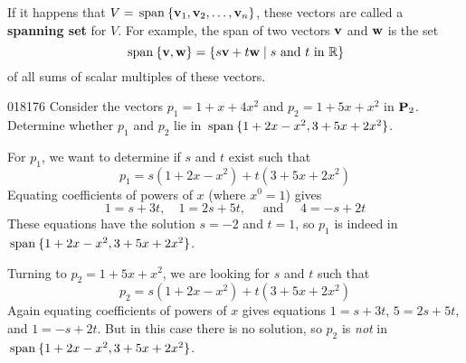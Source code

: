 \noindent If it happens that $V = \thinspace\operatorname{span\medspace}\{\textbf{v}_{1}, \textbf{v}_{2}, \dots, \textbf{v}_{n}\}$, these vectors are called a \textbf{spanning set} for $V$. For example, the span of two vectors $\textbf{v}$ and $\textbf{w}$ is the set
\begin{equation*}
\thinspace\operatorname{span\medspace}\{\textbf{v}, \textbf{w} \} = \{s\textbf{v} + t\textbf{w} \mid s \mbox{ and } t \mbox{ in } \mathbb{R} \}
\end{equation*}
of all sums of scalar multiples of these vectors.

\begin{example}{}{018176}
Consider the vectors $p_{1} = 1 + x + 4x^{2}$ and $p_{2} = 1 + 5x + x^{2}$ in $\textbf{P}_{2}$. Determine whether $p_{1}$ and $p_{2}$ lie in $\thinspace\operatorname{span\medspace}\{1 + 2x - x^{2}, 3 + 5x + 2x^{2}\}$.

\begin{solution}
For $p_{1}$, we want to determine if $s$ and $t$ exist such that
\begin{equation*}
p_1 = s(1 + 2x - x^2) + t(3 + 5x + 2x^2)
\end{equation*}
Equating coefficients of powers of $x$ (where $x^{0} = 1$) gives
\begin{equation*}
1 = s + 3t,\quad 1 = 2s + 5t, \quad \mbox{ and } \quad 4 = -s + 2t
\end{equation*}
These equations have the solution $s = -2$ and $t = 1$, so $p_{1}$ is indeed in $\thinspace\operatorname{span\medspace}\{1 + 2x - x^{2}, 3 + 5x + 2x^{2}\}$.

Turning to $p_{2} = 1 + 5x + x^{2}$, we are looking for $s$ and $t$ such that 
\begin{equation*}
p_{2} = s(1 + 2x - x^{2}) + t(3 + 5x + 2x^{2})
\end{equation*}
 Again equating coefficients of powers of $x$ gives equations $1 = s + 3t$, $5 = 2s + 5t$, and $1 = -s + 2t$. But in this case there is no solution, so $p_{2}$ is \textit{not} in $\thinspace\operatorname{span\medspace}\{1 + 2x - x^{2}, 3 + 5x + 2x^{2}\}$.
\end{solution}
\end{example}


